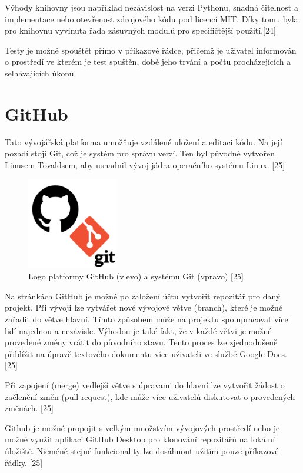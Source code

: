 \documentclass[a4paper,oneside,12pt]{book}
\begin{document}
Výhody knihovny jsou například nezávislost na verzi Pythonu, snadná čitelnost a implementace nebo otevřenost zdrojového kódu pod licencí MIT. Díky tomu byla pro knihovnu vyvinuta řada zásuvných modulů pro specifičtější použití.[24]

Testy je možné spouštět přímo v příkazové řádce, přičemž je uživatel informován o prostředí ve kterém je test spuštěn, době jeho trvání a počtu procházejících a selhávajících úkonů.   

\section{GitHub} \label{github}
Tato vývojářská platforma umožňuje vzdálené uložení a editaci kódu. Na její pozadí stojí Git, což je systém pro správu verzí. Ten byl původně vytvořen Linusem Tovaldsem, aby usnadnil vývoj jádra operačního systému Linux. [25]

\begin{figure}[ht] \label{obr10}
\centering
\includegraphics[height=4cm]{pictures/git.png}
\caption{Logo platformy GitHub (vlevo) a systému Git (vpravo) [25]}
\label{fig:git}
\end{figure}

Na stránkách GitHub je možné po založení účtu vytvořit repozitář pro daný projekt. Při vývoji lze vytvářet nové vývojové větve (branch), které je možné zařadit do větve hlavní. Tímto způsobem může na projektu spolupracovat více lidí najednou a nezávisle. Výhodou je také fakt, že v každé větvi je možné provedené změny vrátit do původního stavu. Tento proces lze zjednodušeně přiblížit na úpravě textového dokumentu více uživateli ve službě Google Docs. [25]

Při zapojení (merge) vedlejší větve s úpravami do hlavní lze vytvořit žádost o začlenění změn (pull-request), kde může více uživatelů diskutovat o provedených změnách. [25]

Github je možné propojit s velkým množstvím vývojových prostředí nebo je možné využít aplikaci GitHub Desktop pro klonování repozitářů na lokální úložiště. Nicméně stejné funkcionality lze dosáhnout užitím pouze
příkazové řádky. [25]
\end{document}

